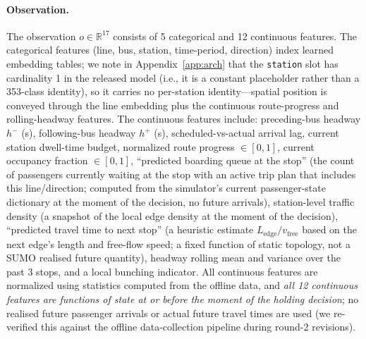 \documentclass[journal,10pt]{IEEEtran}
\begin{document}
\paragraph{Observation.} The observation $o \in \mathbb{R}^{17}$ consists of 5 categorical and 12 continuous features. The categorical features (line, bus, station, time-period, direction) index learned embedding tables; we note in Appendix~\ref{app:arch} that the \texttt{station} slot has cardinality 1 in the released model (i.e., it is a constant placeholder rather than a 353-class identity), so it carries no per-station identity---spatial position is conveyed through the line embedding plus the continuous route-progress and rolling-headway features. The continuous features include: preceding-bus headway $h^{-}$ (s), following-bus headway $h^{+}$ (s), scheduled-vs-actual arrival lag, current station dwell-time budget, normalized route progress $\in [0, 1]$, current occupancy fraction $\in [0, 1]$, ``predicted boarding queue at the stop'' (the count of passengers currently waiting at the stop with an active trip plan that includes this line/direction; computed from the simulator's current passenger-state dictionary at the moment of the decision, no future arrivals), station-level traffic density (a snapshot of the local edge density at the moment of the decision), ``predicted travel time to next stop'' (a heuristic estimate $L_{\text{edge}} / v_{\text{free}}$ based on the next edge's length and free-flow speed; a fixed function of static topology, not a SUMO realised future quantity), headway rolling mean and variance over the past 3 stops, and a local bunching indicator. All continuous features are normalized using statistics computed from the offline data, and \emph{all 12 continuous features are functions of state at or before the moment of the holding decision}; no realised future passenger arrivals or actual future travel times are used (we re-verified this against the offline data-collection pipeline during round-2 revisions).
\end{document}
